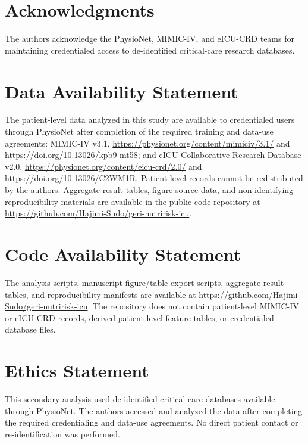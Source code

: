 \documentclass[utf8]{FrontiersinVancouver}
\begin{document}
\section*{Acknowledgments}
The authors acknowledge the PhysioNet, MIMIC-IV, and eICU-CRD teams for maintaining credentialed access to de-identified critical-care research databases.

\section*{Data Availability Statement}
The patient-level data analyzed in this study are available to credentialed users through PhysioNet after completion of the required training and data-use agreements: MIMIC-IV v3.1, \url{https://physionet.org/content/mimiciv/3.1/} and \url{https://doi.org/10.13026/kpb9-mt58}; and eICU Collaborative Research Database v2.0, \url{https://physionet.org/content/eicu-crd/2.0/} and \url{https://doi.org/10.13026/C2WM1R}. Patient-level records cannot be redistributed by the authors. Aggregate result tables, figure source data, and non-identifying reproducibility materials are available in the public code repository at \url{https://github.com/Hajimi-Sudo/geri-nutririsk-icu}.

\section*{Code Availability Statement}
The analysis scripts, manuscript figure/table export scripts, aggregate result tables, and reproducibility manifests are available at \url{https://github.com/Hajimi-Sudo/geri-nutririsk-icu}. The repository does not contain patient-level MIMIC-IV or eICU-CRD records, derived patient-level feature tables, or credentialed database files.

\section*{Ethics Statement}
This secondary analysis used de-identified critical-care databases available through PhysioNet. The authors accessed and analyzed the data after completing the required credentialing and data-use agreements. No direct patient contact or re-identification was performed.



\end{document}

